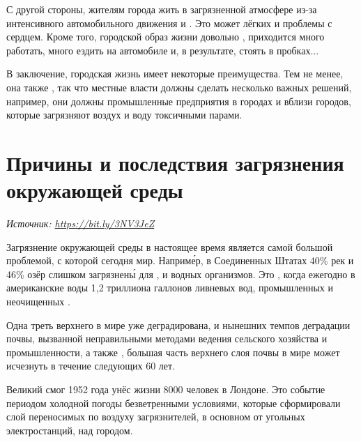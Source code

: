 С другой стороны, жителям города  жить в загрязненной атмосфере из-за интенсивного автомобильного движения и  . Это может   лёгких и проблемы с сердцем. Кроме того, городской образ жизни довольно ,  приходится много работать, много ездить на автомобиле и, в результате, стоять в пробках...

В заключение, городская жизнь имеет некоторые преимущества. Тем не менее, она также , так что местные власти должны сделать несколько важных решений, например, они должны  промышленные предприятия в городах и вблизи городов, которые загрязняют воздух и воду токсичными парами.

\section[Загрязнение окружающей среды]{Причины и последствия загрязнения окружающей среды}
\textit{Источник: \url{https://bit.ly/3NV3JeZ}}

Загрязнение окружающей среды в настоящее время является самой большой проблемой, с которой сегодня  мир. Наприм\'{е}р, в Соединенных Штатах 40\% рек и 46\% озёр слишком загрязнен\'{ы} для ,  и водных организмов. Это , когда ежегодно в американские воды  1,2 триллиона галлонов  ливневых вод, промышленных  и неочищенных .

Одна треть верхнего   в мире уже деградирована, и  нынешних темпов деградации почвы, вызванной неправильными методами ведения сельского хозяйства и промышленности, а также , большая часть верхнего слоя почвы в мире может исчезнуть в течение следующих 60 лет.

Великий смог 1952 года унёс жизни 8000 человек в Лондоне. Это событие  периодом холодной погоды  безветренными условиями, которые сформировали  слой переносимых по воздуху загрязнителей, в основном от угольных электростанций, над городом.

